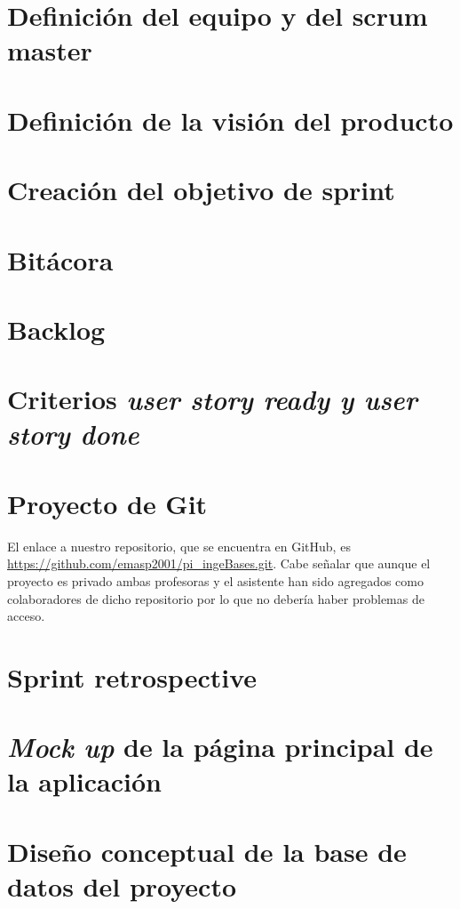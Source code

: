 \documentclass{article}
\begin{document}
\newpage
\tableofcontents

\newpage


\newpage
\section{Definición del equipo y del scrum master}

\section{Definición de la visión del producto}

\section{Creación del objetivo de sprint}

\section{Bitácora}

\section{Backlog}

\section{Criterios \textit{user story ready y user story done}}

\section{Proyecto de Git}
El enlace a nuestro repositorio, que se encuentra en GitHub, es
\url{https://github.com/emasp2001/pi_ingeBases.git}. Cabe señalar que
aunque el proyecto es privado ambas profesoras y el asistente han sido
agregados como colaboradores de dicho repositorio por lo que no debería
haber problemas de acceso.

\section{Sprint retrospective}

\section{\textit{Mock up} de la página principal de la aplicación}

\section{Diseño conceptual de la base de datos del proyecto}


\newpage


\end{document}
